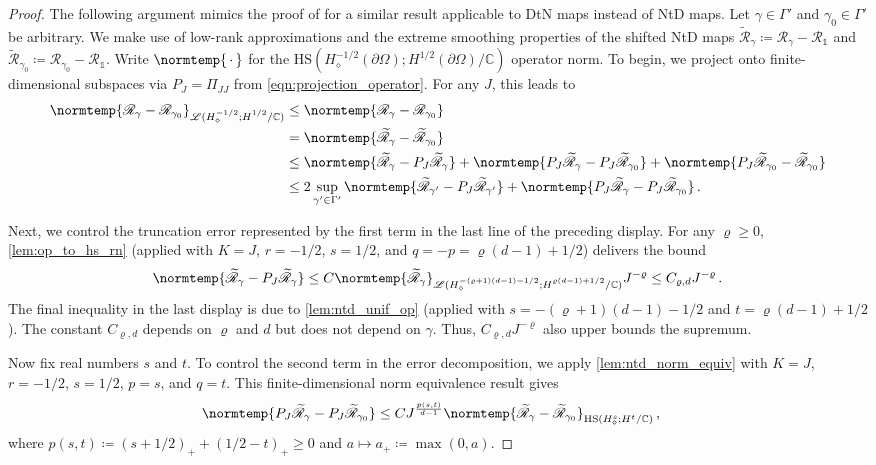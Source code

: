 \documentclass[pdflatex,sn-mathphys-num]{sn-jnl-preprint}
\newcommand{\C}{\mathbb{C}}
\newcommand{\sL}{\mathscr{L}}
\newcommand{\sR}{\mathscr{R}}
\newcommand{\pOmega}{{\partial\Omega}}
\newcommand{\ntd}{\mathscr{R}_{\gamma}}
\newcommand{\ntdz}{\mathscr{R}_{\gamma_0}}
\newcommand{\tntd}{\widetilde{\mathscr{R}}_{\gamma}}
\newcommand{\tntdz}{\widetilde{\mathscr{R}}_{\gamma_0}}
\newcommand{\norm}{\normtemp}
\newcommand{\defeq}{\coloneqq} %
\newcommand{\HS}{\mathrm{HS}} %
\newcommand{\onebm}{\mathds{1}} %
\newcommand{\slot}{{\,\cdot\,}}
\theoremstyle{thmstyleone}%
\theoremstyle{thmstyletwo}%
\theoremstyle{thmstylethree}%
\numberwithin{equation}{section}
\numberwithin{theorem}{section}
\begin{document}
\begin{proof}
    The following argument mimics the proof of \cite[Lemma~5, p.~177]{abraham2019statistical} for a similar result applicable to DtN maps instead of NtD maps. Let $\gamma\in\Gamma'$ and $\gamma_0\in\Gamma'$ be arbitrary. We make use of low-rank approximations and the extreme smoothing properties of the shifted NtD maps $\tntd\defeq \ntd-\sR_{\onebm}$ and $\tntdz\defeq \ntdz - \sR_{\onebm}$.
    Write $\norm{\slot}$ for the $\HS(H_\diamond^{-1/2}(\pOmega);H^{1/2}(\pOmega)/\C)$ operator norm. To begin, we project onto finite-dimensional subspaces via $P_J=\Pi_{JJ}$ from \eqref{eqn:projection_operator}. For any $J$, this leads to
    \begin{align*}
        \norm{\ntd-\sR_{\gamma_0}}_{\sL(H_\diamond^{-1/2};H_{\phantom{\diamond}}^{1/2}/\C)}&\leq \norm{\ntd-{\sR}_{\gamma_0}}\\
        &=\norm{{\tntd} - {\tntdz}}\\
        &\leq \norm{{\tntd} - P_{J}\tntd} + \norm{P_{J}\tntd - P_{J}\tntdz}  + \norm{P_{J}\tntdz - \tntdz}\\
        &\leq 2\sup_{\gamma'\in\Gamma'}\norm{\widetilde{\sR}_{\gamma'} - P_{J}\widetilde{\sR}_{\gamma'}}  + \norm{P_{J}\tntd - P_{J}\tntdz}\,.
    \end{align*}
    
    Next, we control the truncation error represented by the first term in the last line of the preceding display. For any $\varrho \geq 0$, \cref{lem:op_to_hs_rn} (applied with $K=J$, $r=-1/2$, $s=1/2$, and $q=-p=\varrho(d-1) + 1/2$) delivers the bound
    \begin{align*}
        \norm{{\tntd} - P_{J}\tntd}\leq C \norm{\tntd}_{\sL(H^{-(\varrho+1)(d-1)- 1/2}_\diamond;H_{\phantom{\diamond}}^{\varrho(d-1) + 1/2}/\C)} J^{-\varrho}\leq C_{\varrho,d} J^{-\varrho}\,.
    \end{align*}
    The final inequality in the last display is due to \cref{lem:ntd_unif_op} (applied with $s=-(\varrho+1)(d-1)-1/2$ and $t=\varrho(d-1) + 1/2$). The constant $C_{\varrho,d}$ depends on $\varrho$ and $d$ but does not depend on $\gamma$. Thus, $C_{\varrho,d} J^{-\varrho}$ also upper bounds the supremum.
    
    Now fix real numbers $s$ and $t$. To control the second term in the error decomposition, we apply \cref{lem:ntd_norm_equiv} with $K=J$, $r=-1/2$, $s=1/2$, $p=s$, and $q=t$. This finite-dimensional norm equivalence result gives
    \begin{align*}
        \norm{P_J\tntd - P_J\tntdz}&\leq C J^{\frac{p(s,t)}{d-1}}\norm{\tntd -\tntdz}_{\HS(H^{s}_\diamond;H^{t}/\C)}\,,
    \end{align*}
    where $p(s,t)\defeq (s+1/2)_+ + (1/2-t)_+\geq 0$ and $a\mapsto a_+\defeq\max(0,a)$. 
    

\end{proof}
\end{document}
